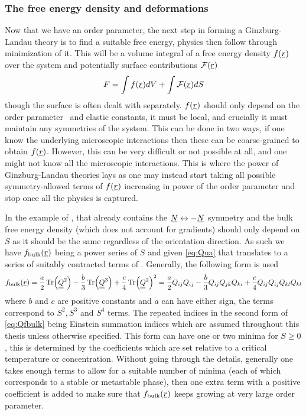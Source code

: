 \documentclass[12pt]{article}
\newcommand{\suf}[2]{\stackunder[0.5pt]{\stackunder[1pt]{\ensuremath{#1}}{\rule{\widthof{\ensuremath{#2}}*\real{0.9}}{.1ex}}}{}}
\newcommand{\duf}[2]{\stackunder[0.5pt]{\stackunder[0.8pt]{\stackunder[1pt]{\ensuremath{#1}}{\rule{\widthof{\ensuremath{#2}}*\real{0.9}}{.1ex}}}{\rule{\widthof{\ensuremath{#2}}*\real{0.9}}{.1ex}}}{}}
\newcommand{\su}[1]{\suf{#1}{#1}}
\newcommand{\du}[1]{\duf{#1}{#1}}
\newcommand{\QQ}{\du{Q}}
\begin{document}
\subsubsection{The free energy density and deformations}
Now that we have an order parameter, the next step in forming a Ginzburg-Landau theory is to find a suitable free energy, physics then follow through minimization of it.
This will be a volume integral of a free energy density $f(\su{r})$ over the system and potentially surface contributions $\mathcal{F}(\su{r})$
\begin{equation}
    F = \int f(\su{r}) dV + \int \mathcal{F}(\su{r}) dS
\end{equation}
though the surface is often dealt with separately.
$f(\su{r})$ should only depend on the order parameter \QQ\ and elastic constants, it must be local, and crucially it must maintain any symmetries of the system\cite{kardarStatisticalPhysicsFields2007,reichlModernCourseStatistical2016}.
This can be done in two ways, if one know the underlying microscopic interactions then these can be coarse-grained to obtain $f(\su{r})$.
However, this can be very difficult or not possible at all, and one might not know all the microscopic interactions.
This is where the power of Ginzburg-Landau theories lays as one may instead start taking all possible symmetry-allowed terms of $f(\su{r})$ increasing in power of the order parameter and stop once all the physics is captured.

In the example of \QQ, that already contains the $\su{N} \leftrightarrow -\su{N}$ symmetry and the bulk free energy density (which does not account for gradients) should only depend on $S$ as it should be the same regardless of the orientation direction.
As such we have $f_\text{bulk}(\su{r})$ being a power series of $S$ and given \cref{eq:Qua} that translates to a series of suitably contracted terms of \QQ.
Generally, the following form is used
\begin{equation}\label{eq:Qfbulk}
    f_\text{bulk}(\su{r}) = \frac{a}{2} \Tr(\du{Q}^2) - \frac{b}{3} \Tr(\du{Q}^3) + \frac{c}{4} \Tr(\du{Q}^2)^2 = \frac{a}{2} Q_{ij}Q_{ij} - \frac{b}{3} Q_{ij}Q_{jk}Q_{ki} + \frac{c}{4} Q_{ij}Q_{ij}Q_{kl}Q_{kl}
\end{equation}
where $b$ and $c$ are positive constants and $a$ can have either sign, the terms correspond to $S^2, S^3$ and $S^4$ terms\cite{brayTheoryPhaseOrdering1993,luckhurstBiaxialNematicLiquid2015}.
The repeated indices in the second form of \cref{eq:Qfbulk} being Einstein summation indices which are assumed throughout this thesis unless otherwise specified.
This form can have one or two minima for $S\geq0$, this is determined by the coefficients which are set relative to a critical temperature or concentration.
Without going through the details, generally one takes enough terms to allow for a suitable number of minima (each of which corresponds to a stable or metastable phase), then one extra term with a positive coefficient is added to make sure that $f_\text{bulk}(\su{r})$ keeps growing at very large order parameter.
\end{document}
